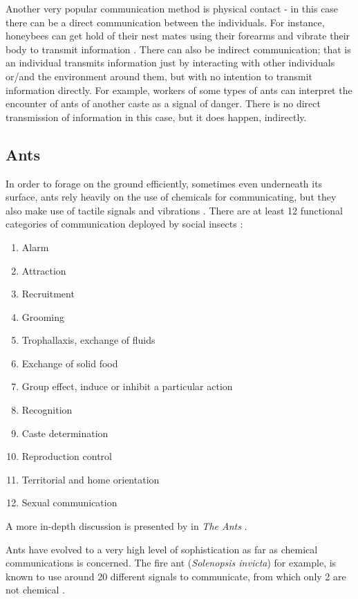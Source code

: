 Another very popular communication method is physical contact - in this case there can be a direct communication between the individuals. For instance, honeybees can get hold of their nest mates using their forearms and vibrate their body to transmit information \cite{allen1959}. There can also be  indirect communication; that is an individual transmits information just by interacting with other individuals or/and the environment around them, but with no intention to transmit information directly. For example, workers of some types of ants can interpret the encounter of ants of another caste as a signal of danger. There is no direct transmission of information in this case, but it does happen, indirectly.

\subsection{Ants}
\label{sec:com-ants}

In order to forage on the ground efficiently, sometimes even underneath its surface, ants rely heavily on the use of chemicals for communicating, but they also make use of tactile signals and vibrations \cite{holldobler1999}. There are at least 12 functional categories of communication deployed by social insects \cite{citeulike:3731267}:

\begin{enumerate}
  \item Alarm
  \item Attraction
  \item Recruitment
  \item Grooming
  \item Trophallaxis, exchange of fluids
  \item Exchange of solid food
  \item Group effect, induce or inhibit a particular action
  \item Recognition
  \item Caste determination
  \item Reproduction control
  \item Territorial and home orientation
  \item Sexual communication
\end{enumerate}

A more in-depth discussion is presented by \citeauthor{holldobler1990} in \emph{The Ants} \cite{holldobler1990}.

Ants have evolved to a very high level of sophistication as far as chemical communications is concerned. The fire ant (\emph{Solenopsis invicta}) for example, is known to use around 20 different signals to communicate, from which only 2 are not chemical \cite{citeulike:3731267} \cite{tschinkel2006fire}.

